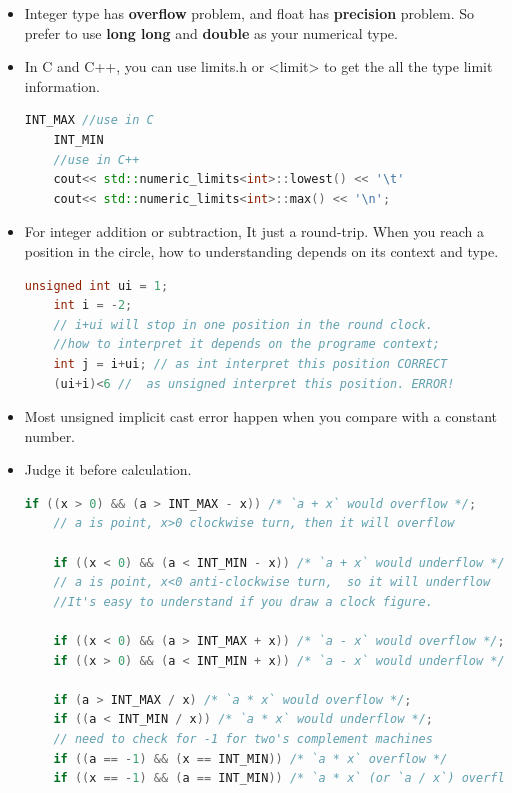\documentclass[a4paper,12pt,twoside]{book}
\begin{document}
\begin{itemize}
	\item Integer type has \textbf{overflow} problem, and float has \textbf{precision} problem. So prefer to use \textbf{long long} and \textbf{double} as your numerical type.
	
	\item In C and C++, you can use limits.h or <limit> to get the all the type limit information.
	\begin{lstlisting}[frame=single, language=c++]
	INT_MAX //use in C
	INT_MIN
	//use in C++
	cout<< std::numeric_limits<int>::lowest() << '\t'
	cout<< std::numeric_limits<int>::max() << '\n';
	\end{lstlisting}
	
	\item For integer addition or subtraction, It just a round-trip. When you reach a position in the circle, how to understanding depends on its context and type.
	
	\begin{lstlisting}[frame=single, language=c++]
	unsigned int ui = 1;
	int i = -2;
	// i+ui will stop in one position in the round clock.
	//how to interpret it depends on the programe context;
	int j = i+ui; // as int interpret this position CORRECT
	(ui+i)<6 //  as unsigned interpret this position. ERROR!
	\end{lstlisting}
	
	\item Most unsigned implicit cast error happen when you compare with a constant number. 
	
	\item  Judge it before calculation.
	\begin{lstlisting}[frame=single, language=c++]
	if ((x > 0) && (a > INT_MAX - x)) /* `a + x` would overflow */;
	// a is point, x>0 clockwise turn, then it will overflow
	
	if ((x < 0) && (a < INT_MIN - x)) /* `a + x` would underflow */;
	// a is point, x<0 anti-clockwise turn,  so it will underflow
	//It's easy to understand if you draw a clock figure.
	
	if ((x < 0) && (a > INT_MAX + x)) /* `a - x` would overflow */;
	if ((x > 0) && (a < INT_MIN + x)) /* `a - x` would underflow */;
	
	if (a > INT_MAX / x) /* `a * x` would overflow */;
	if ((a < INT_MIN / x)) /* `a * x` would underflow */;
	// need to check for -1 for two's complement machines
	if ((a == -1) && (x == INT_MIN)) /* `a * x` overflow */
	if ((x == -1) && (a == INT_MIN)) /* `a * x` (or `a / x`) overflow */
	\end{lstlisting}
	

\end{itemize}
\end{document}
